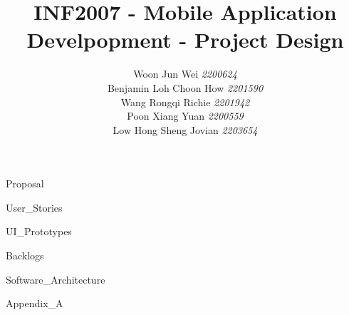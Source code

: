 \documentclass[a4paper, 11pt, notitlepage]{report}
\author{
        Woon Jun Wei \textit{2200624} \\
        Benjamin Loh Choon How \textit{2201590} \\
        Wang Rongqi Richie \textit{2201942} \\
        Poon Xiang Yuan \textit{2200559} \\
        Low Hong Sheng Jovian \textit{2203654}\\
    }
\title{
  INF2007 - Mobile Application Develpopment - Project Design 
}
\begin{document}
\maketitle


{Proposal}


{User_Stories}


{UI_Prototypes}


{Backlogs}


{Software_Architecture}

\appendix
{Appendix_A}



\newpage

 


\end{document}
